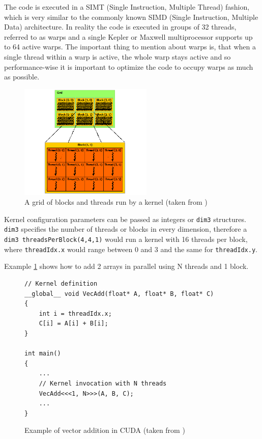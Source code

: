 The code is executed in a SIMT (Single Instruction, Multiple Thread) fashion, which is very similar to the commonly known SIMD (Single Instruction, Multiple Data) architecture. In reality the code is executed in groups of 32 threads, referred to as warps and a single Kepler or Maxwell multiprocessor supports up to 64 active warps. The important thing to mention about warps is, that when a single thread within a warp is active, the whole warp stays active and so performance-wise it is important to optimize the code to occupy warps as much as possible.

\begin{center}
\begin{figure}[h]
	\centering\includegraphics[height=5.5cm]{fig/grid-of-thread-blocks.png}
	\caption{A grid of blocks and threads run by a kernel (taken from \cite{cuda-toolkit-docs})}
\end{figure}
\end{center}

Kernel configuration parameters can be passed as integers or \verb|dim3| structures. \verb|dim3| specifies the number of threads or blocks in every dimension, therefore a \verb|dim3 threadsPerBlock(4,4,1)| would run a kernel with 16 threads per block, where \verb|threadIdx.x| would range between 0 and 3 and the same for \verb|threadIdx.y|.

Example \ref{code:cuda-example} shows how to add 2 arrays in parallel using N threads and 1 block.

\begin{figure}[h]
\begin{verbatim}
// Kernel definition
__global__ void VecAdd(float* A, float* B, float* C)
{
    int i = threadIdx.x;
    C[i] = A[i] + B[i];
}

int main()
{
    ...
    // Kernel invocation with N threads
    VecAdd<<<1, N>>>(A, B, C);
    ...
}
\end{verbatim}

\caption{Example of vector addition in CUDA (taken from \cite{cuda-toolkit-docs})}
\label{code:cuda-example}
\end{figure}

